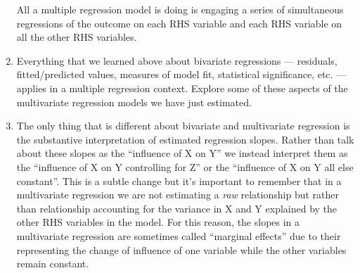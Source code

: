 \documentclass[a4paper,12pt]{article}
\begin{document}
\begin{enumerate}
\noindent All a multiple regression model is doing is engaging a series of simultaneous regressions of the outcome on each RHS variable and each RHS variable on all the other RHS variables.

\item Everything that we learned above about bivariate regressions --- residuals, fitted/predicted values, measures of model fit, statistical significance, etc. --- applies in a multiple regression context. Explore some of these aspects of the multivariate regression models we have just estimated.

\item The only thing that is different about bivariate and multivariate regression is the substantive interpretation of estimated regression slopes. Rather than talk about these slopes as the ``influence of X on Y'' we instead interpret them as the ``influence of X on Y controlling for Z'' or the ``influence of X on Y all else constant''. This is a subtle change but it's important to remember that in a multivariate regression we are not estimating a \textit{raw} relationship but rather than relationship accounting for the variance in X and Y explained by the other RHS variables in the model. For this reason, the slopes in a multivariate regression are sometimes called ``marginal effects'' due to their representing the change of influence of one variable while the other variables remain constant.

\end{enumerate}
\end{document}
